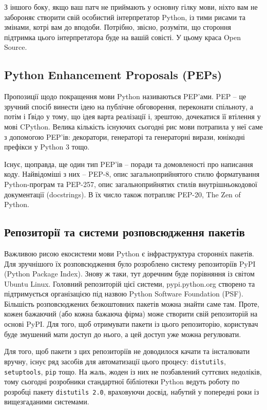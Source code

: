 \documentclass[a4paper, 12pt, onsedie]{article}
\begin{document}
    З іншого боку, якщо ваш патч не приймають у основну гілку мови, ніхто вам не забороняє створити
    свій особистий інтерпретатор Python, із тими рисами та змінами, котрі вам до вподоби. Потрібно,
    звісно, розуміти, що стороння підтримка цього інтерпретатора буде на вашій совісті. У цьому краса
    Open Source.

\subsection{Python Enhancement Proposals (PEPs)}
    Пропозиції щодо покращення мови Python називаються PEP'ами. PEP -- це зручний спосіб винести ідею
    на публічне обговорення, переконати спільноту, а потім і Ґвідо у тому, що ідея варта реалізації і,
    зрештою, дочекатися її втілення у мові CPython. Велика кількість існуючих сьогодні рис мови потрапила
    у неї саме з допомогою PEP'ів: декоратори, генераторі та генераторні вирази, юнікодні префікси у 
    Python 3 тощо.

    Існує, щоправда, ще один тип  PEP'ів -- поради та домовленості про написання коду. Найвідоміші 
    з них -- PEP-8, опис загальноприйнятого стилю форматування Python-програм та PEP-257, опис
    загальноприйнятих стилів внутрішньокодової документації (docstrings). В їх число також потрапляє
    PEP-20, The Zen of Python.

\subsection{Репозиторії та системи розповсюдження пакетів}
    Важливою рисою екосистеми мови Python є інфраструктура сторонніх пакетів. Для зручнішого їх
    розповсюдження було розроблено систему репозиторіїв PyPI (Python Package Index). Знову ж таки, тут
    доречним буде порівняння із світом Ubuntu Linux. Головний репозиторій цієї системи, pypi.python.org
    створено та підтримується організацією під назвою Python Software Foundation (PSF). Більшість
    розповсюджених безкоштовних пакетів можна знайти саме там. Проте, кожен бажаючий (або кожна бажаюча
    фірма) може створити свій репозиторій на основі PyPI. Для того, щоб отримувати пакети із цього
    репозиторію, користувач буде змушений мати доступ до нього, а цей доступ уже можна регулювати.

    Для того, щоб пакети з цих репозиторіїв не доводилося качати та інсталювати вручну, існує ряд засобів
    для автоматизації цього процесу: \texttt{distutils}, \texttt{setuptools}, \texttt{pip} тощо. На жаль,
    жоден із них не позбавлений суттєвих недоліків, тому сьогодні розробники стандартної бібліотеки 
    Python ведуть роботу по розробці пакету \texttt{distutils 2.0}, враховуючи досвід, набутий у попередні
    роки із вищезгаданими системами.
\end{document}
